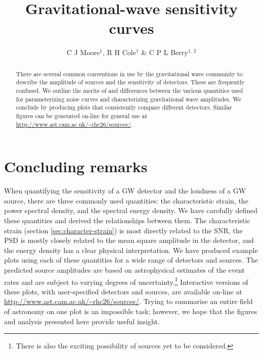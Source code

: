 \documentclass[fleqn,12pt]{iopart}
\begin{document}
\title{Gravitational-wave sensitivity curves}
\author{C J Moore$^1$, R H Cole$^1$ \& C P L Berry$^{1,\,2}$}
\address{$^1$ Institute of Astronomy, Madingley Road, Cambridge, CB3 0HA, United Kingdom}
\address{$^2$ School of Physics and Astronomy, University of Birmingham, Edgbaston, Birmingham B15 2TT, United Kingdom}

\begin{abstract}
There are several common conventions in use by the gravitational wave community to describe the amplitude of sources and the sensitivity of detectors. These are frequently confused. We outline the merits of and differences between the various quantities used for parameterizing noise curves and characterizing gravitational wave amplitudes. We conclude by producing plots that consistently compare different detectors. Similar figures can be generated on-line for general use at \url{http://www.ast.cam.ac.uk/~rhc26/sources/}.
\end{abstract}







\section{Concluding remarks}\label{sec:discussion}

When quantifying the sensitivity of a GW detector and the loudness of a GW source, there are three commonly used quantities: the characteristic strain, the power spectral density, and the spectral energy density. We have carefully defined these quantities and derived the relationships between them. The characteristic strain (section \ref{sec:character-strain}) is most directly related to the SNR, the PSD is mostly closely related to the mean square amplitude in the detector, and the energy density has a clear physical interpretation. We have produced example plots using each of these quantities for a wide range of detectors and sources. The predicted source amplitudes are based on astrophysical estimates of the event rates and are subject to varying degrees of uncertainty.\footnote{There is also the exciting possibility of sources yet to be considered.} Interactive versions of these plots, with user-specified detectors and sources, are available on-line at \url{http://www.ast.cam.ac.uk/~rhc26/sources/}. Trying to summarise an entire field of astronomy on one plot is an impossible task; however, we hope that the figures and analysis presented here provide useful insight.



\clearpage



\end{document}
